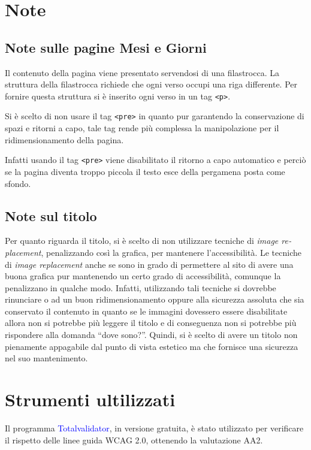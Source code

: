 \documentclass[10pt,a4paper,onecolumn]{article}
\newcommand{\inglese}[1]{\foreignlanguage{english}{\itshape{}#1}}
\newcommand{\progname}[1]{\textcolor{blue}{\textsf{#1}}}
\begin{document}
\section{Note}
\subsection{Note sulle pagine Mesi e Giorni}
Il contenuto della pagina viene presentato servendosi di una filastrocca. La struttura della filastrocca richiede che ogni verso occupi una riga differente. Per fornire questa struttura si è inserito ogni verso in un tag \texttt{<p>}.

Si è scelto di non usare il tag \texttt{<pre>} in quanto pur garantendo la conservazione di spazi e ritorni a capo, tale tag rende più complessa la manipolazione per il ridimensionamento della pagina.

Infatti usando il tag \texttt{<pre>} viene disabilitato il ritorno a capo automatico e perciò se la pagina diventa troppo piccola il testo esce della pergamena posta come sfondo.

\subsection{Note sul titolo}

Per quanto riguarda il titolo, si è scelto di non utilizzare tecniche di \inglese{image replacement}, penalizzando così la grafica, per mantenere l'accessibilità. Le tecniche di \inglese{image replacement} anche se sono in grado di permettere al sito di avere una buona grafica pur mantenendo un certo grado di accessibilità, comunque la penalizzano in qualche modo. Infatti, utilizzando tali tecniche si dovrebbe rinunciare o ad un buon ridimensionamento oppure alla sicurezza assoluta che sia conservato il contenuto in quanto se le immagini dovessero essere disabilitate allora non si potrebbe più leggere il titolo e di conseguenza non si potrebbe più rispondere alla domanda ``dove sono?''. Quindi, si è scelto di avere un titolo non pienamente appagabile dal punto di vista estetico ma che fornisce una sicurezza nel suo mantenimento.


\section{Strumenti ultilizzati}

Il programma \progname{Totalvalidator}, in versione gratuita, è stato utilizzato per verificare il rispetto delle linee guida WCAG 2.0, ottenendo la valutazione AA2.
\end{document}
